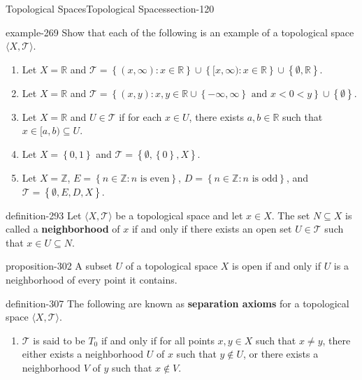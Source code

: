 \documentclass[oneside,10pt,]{article}
\newcommand{\terminology}[1]{\textbf{#1}}
\newcommand{\tuple}[1]{\langle #1 \rangle}
\newcommand{\mb}{\mathbb}
\newcommand{\mc}{\mathcal}
\newcommand{\setBuilder}[2]{\left\{#1:#2\right\}}
\newcommand{\setList}[1]{\left\{#1\right\}}
\newcommand{\lt}{<}
\begin{document}
\begin{sectionptx}{Topological Spaces}{}{Topological Spaces}{}{}{section-120}
\begin{example}{}{example-269}%
\hypertarget{p-270}{}%
Show that each of the following is an example of a topological space \(\tuple{X,\mc T}\).%
\leavevmode%
\begin{enumerate}
\item\hypertarget{li-273}{}Let \(X=\mb R\) and \(\mc T=\setBuilder{(x,\infty)}{x\in\mb R}
\cup\setBuilder{[x,\infty)}{x\in\mb R}\cup\setList{\emptyset,\mb R}\).%
\item\hypertarget{li-276}{}Let \(X=\mb R\) and \(\mc T=\setBuilder{(x,y)}{
x,y\in\mb R\cup\setList{-\infty,\infty} \text{ and }x\lt 0\lt y
}\cup\setList{\emptyset}\).%
\item\hypertarget{li-279}{}Let \(X=\mb R\) and \(U\in\mc T\) if for each \(x\in U\), there exists \(a,b\in\mb R\) such that \(x\in[a,b)\subseteq U\).%
\item\hypertarget{li-285}{}Let \(X=\setList{0,1}\) and \(\mc T=\setList{\emptyset,\setList{0},X}\).%
\item\hypertarget{li-288}{}Let \(X=\mb Z\), \(E=\setBuilder{n\in\mb Z}{n\text{ is even}}\), \(D=\setBuilder{n\in\mb Z}{n\text{ is odd}}\), and \(\mc T=\setList{\emptyset,E,D,X}\).%
\end{enumerate}
\end{example}
\begin{definition}{}{definition-293}%
\hypertarget{p-294}{}%
Let \(\tuple{X,\mc T}\) be a topological space and let \(x\in X\). The set \(N\subseteq X\) is called a \terminology{neighborhood} of \(x\) if and only if there exists an open set \(U\in\mc T\) such that \(x\in U\subseteq N\).%
\end{definition}
\begin{proposition}{}{}{proposition-302}%
\hypertarget{p-303}{}%
A subset \(U\) of a topological space \(X\) is open if and only if \(U\) is a neighborhood of every point it contains.%
\end{proposition}
\begin{definition}{}{definition-307}%
\hypertarget{p-308}{}%
The following are known as \terminology{separation axioms} for a topological space \(\tuple{X,\mc T}\).%
\leavevmode%
\begin{enumerate}
\item\hypertarget{li-312}{}\(\mc T\) is said to be \terminology{\(T_0\)} if and only if for all points \(x,y\in X\) such that \(x\not=y\), there either exists a neighborhood \(U\) of \(x\) such that \(y\not\in U\), or there exists a neighborhood \(V\) of \(y\) such that \(x\not\in V\).%

\end{enumerate}
\end{definition}
\end{sectionptx}
\end{document}
